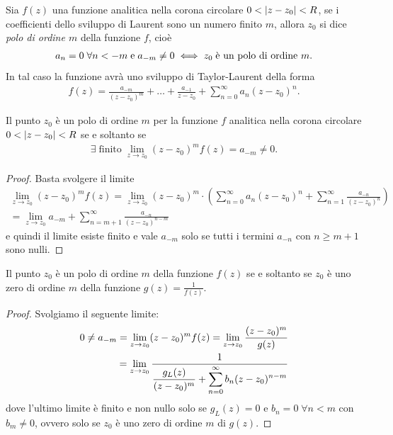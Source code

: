 \begin{definition}
  Sia $ f(z) $ una funzione analitica nella corona circolare $ 0 < \left|{z - z_0}\right| < R $, se i coefficienti dello sviluppo di Laurent sono un 
  numero finito $ m $, allora $ z_0 $ si dice \textit{polo di ordine $ m $} della funzione $ f $, cioè
  \begin{align}
    a_{n} = 0 \; \forall n < -m \; \text{e} \; a_{-m} \neq 0 \iff z_0 \; \text{è un polo di ordine $ m $}.
  \end{align}
  In tal caso la funzione avrà uno sviluppo di Taylor-Laurent della forma 
  \begin{align}
    f(z) = \frac{a_{-m}}{(z - z_0)^m} + \dots + \frac{a_{-1}}{z - z_0} + \sum_{n=0}^\infty a_n (z - z_0)^n.
  \end{align}
\end{definition}

\begin{theorem}
  Il punto $ z_0 $ è un polo di ordine $ m $ per la funzione $ f $ analitica nella corona circolare $ 0 < \left|{z - z_0}\right| < R $ se e soltanto se
  \begin{align}
    \exists \; \text{finito} \; \lim_{z \to z_0} (z - z_0)^m f(z) = a_{-m} \neq 0.
  \end{align}
\end{theorem}
\begin{proof}
  Basta svolgere il limite 
  \begin{gather}
    \lim_{z \to z_0} (z - z_0)^m f(z) 
    = \lim_{z \to z_0} (z - z_0)^m \cdot \left( \sum_{n = 0}^\infty a_n (z - z_0)^n  + \sum_{n = 1}^\infty \frac{a_{-n}}{(z - z_0)^{n}} \right)
    \\
    = \lim_{z \to z_0} a_{-m} + \sum_{n = m + 1}^\infty \frac{a_{-n}}{ (z - z_0)^{n - m}}
  \end{gather}
  e quindi il limite esiste finito e vale $ a_{-m} $ solo se tutti i termini $ a_{-n} $ con $ n \geq m + 1 $ sono nulli.
\end{proof}

\begin{corollary}
  Il punto $ z_0 $ è un polo di ordine $ m $ della funzione $ f(z) $ se e soltanto se $ z_0 $ è uno zero di ordine $ m $ della funzione 
  $ g(z) = \frac1{f(z)} $.
\end{corollary}
\begin{proof}
  Svolgiamo il seguente limite:
  \begin{align}
    0 \neq a_{-m} = \lim_{z \to z_0} (z - z_0)^m f(z) = \lim_{z \to z_0} \frac{(z - z_0)^m}{g(z)} 
    \\
    = \lim_{z \to z_0} \frac{1}{\displaystyle \frac{g_L(z)}{(z - z_0)^m} + \sum_{n = 0}^\infty b_n (z - z_0)^{n -m}} 
  \end{align}
  dove l'ultimo limite è finito e non nullo solo se $ g_L(z) = 0 $ e $ b_n = 0\; \forall n < m $ con $ b_m \neq 0 $, ovvero solo se $ z_0 $ è 
  uno zero di ordine $ m $ di $ g(z) $.
\end{proof}

